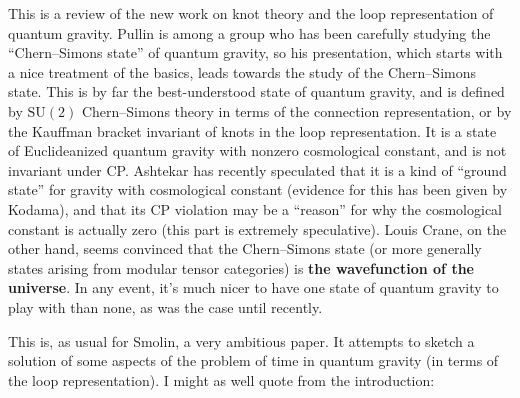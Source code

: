 \documentclass{article}
\def\tightlist{}
\renewcommand{\texttt}[1]{%
  \begingroup
  \ttfamily
  \begingroup\lccode`~=`/\lowercase{\endgroup\def~}{/\discretionary{}{}{}}%
  \begingroup\lccode`~=`[\lowercase{\endgroup\def~}{[\discretionary{}{}{}}%
  \begingroup\lccode`~=`.\lowercase{\endgroup\def~}{.\discretionary{}{}{}}%
  \catcode`/=\active\catcode`[=\active\catcode`.=\active
  \scantokens{#1\noexpand}%
  \endgroup
}
\begin{document}
This is a review of the new work on knot theory and the loop
representation of quantum gravity. Pullin is among a group who has been
carefully studying the ``Chern--Simons state'' of quantum gravity, so his
presentation, which starts with a nice treatment of the basics, leads
towards the study of the Chern--Simons state. This is by far the
best-understood state of quantum gravity, and is defined by
\(\mathrm{SU}(2)\) Chern--Simons theory in terms of the connection
representation, or by the Kauffman bracket invariant of knots in the
loop representation. It is a state of Euclideanized quantum gravity with
nonzero cosmological constant, and is not invariant under CP. Ashtekar
has recently speculated that it is a kind of ``ground state'' for
gravity with cosmological constant (evidence for this has been given by
Kodama), and that its CP violation may be a ``reason'' for why the
cosmological constant is actually zero (this part is extremely
speculative). Louis Crane, on the other hand, seems convinced that the
Chern--Simons state (or more generally states arising from modular tensor
categories) is \textbf{the wavefunction of the universe}. In any event,
it's much nicer to have one state of quantum gravity to play with than
none, as was the case until recently.

\noindent
This is, as usual for Smolin, a very ambitious paper. It attempts to
sketch a solution of some aspects of the problem of time in quantum
gravity (in terms of the loop representation). I might as well quote
from the introduction:
\end{document}
